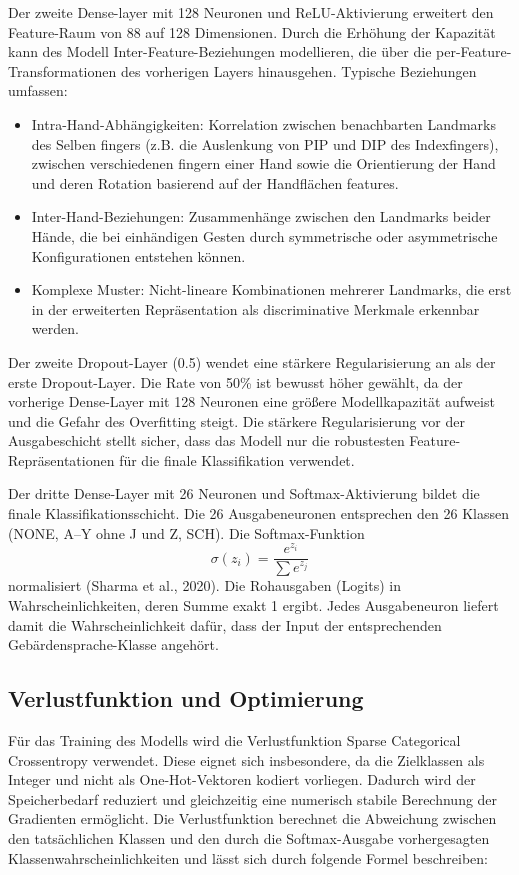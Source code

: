 Der zweite Dense-layer mit 128 Neuronen und ReLU-Aktivierung erweitert den Feature-Raum von 88 auf 128 Dimensionen. Durch die Erhöhung der Kapazität kann des Modell Inter-Feature-Beziehungen modellieren, die über die per-Feature-Transformationen des vorherigen Layers hinausgehen. Typische Beziehungen umfassen:

\begin{itemize}

    \item Intra-Hand-Abhängigkeiten: Korrelation zwischen benachbarten Landmarks des Selben fingers (z.B. die Auslenkung von PIP und DIP des Indexfingers), zwischen verschiedenen fingern einer Hand sowie  die Orientierung der Hand und deren Rotation basierend auf der Handflächen features.
    \item Inter-Hand-Beziehungen: Zusammenhänge zwischen den Landmarks beider Hände, die bei einhändigen Gesten durch symmetrische oder asymmetrische Konfigurationen entstehen können.
    \item Komplexe Muster: Nicht-lineare Kombinationen mehrerer Landmarks, die erst in der erweiterten Repräsentation als discriminative Merkmale erkennbar werden.
\end{itemize}

Der zweite Dropout-Layer (0.5) wendet eine stärkere Regularisierung an als der erste Dropout-Layer. Die Rate von 50\% ist bewusst höher gewählt, da der vorherige Dense-Layer mit 128 Neuronen eine größere Modellkapazität aufweist und die Gefahr des Overfitting steigt. Die stärkere Regularisierung vor der Ausgabeschicht stellt sicher, dass das Modell nur die robustesten Feature-Repräsentationen für die finale Klassifikation verwendet.

Der dritte Dense-Layer mit 26 Neuronen und Softmax-Aktivierung bildet die finale Klassifikationsschicht. Die 26 Ausgabeneuronen entsprechen den 26 Klassen (NONE, A–Y ohne J und Z, SCH). Die Softmax-Funktion $$\sigma(z_i) = \frac{e^{z_i}}{\sum e^{z_j}}$$normalisiert (Sharma et al., 2020). Die Rohausgaben (Logits) in Wahrscheinlichkeiten, deren Summe exakt 1 ergibt. Jedes Ausgabeneuron liefert damit die Wahrscheinlichkeit dafür, dass der Input der entsprechenden Gebärdensprache-Klasse angehört.

\subsection{Verlustfunktion und Optimierung}

Für das Training des Modells wird die Verlustfunktion Sparse Categorical Crossentropy verwendet. Diese eignet sich insbesondere, da die Zielklassen als Integer und nicht als One-Hot-Vektoren kodiert vorliegen. Dadurch wird der Speicherbedarf reduziert und gleichzeitig eine numerisch stabile Berechnung der Gradienten ermöglicht. Die Verlustfunktion berechnet die Abweichung zwischen den tatsächlichen Klassen und den durch die Softmax-Ausgabe vorhergesagten Klassenwahrscheinlichkeiten und lässt sich durch folgende Formel beschreiben:

